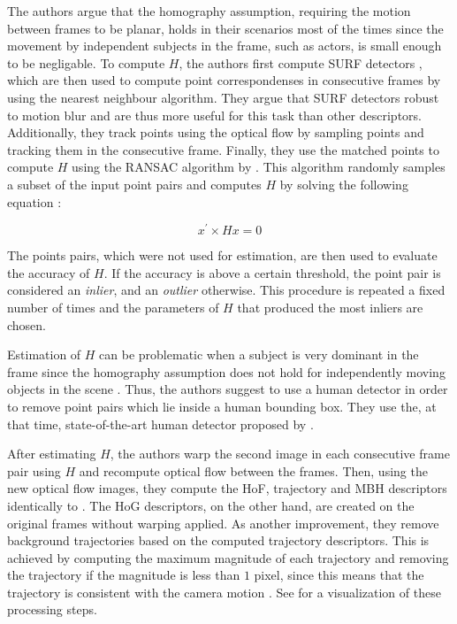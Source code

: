 The authors argue that the homography assumption, requiring the motion between frames to be planar, holds in their scenarios most of the times since the movement by independent subjects in the frame, such as actors, is small enough to be negligable.
To compute $H$, the authors first compute SURF detectors \cite{bay_surf:_2006}, which are then used to compute point correspondenses in consecutive frames by using the nearest neighbour algorithm.
They argue that SURF detectors robust to motion blur and are thus more useful for this task than other descriptors.
Additionally, they track points using the optical flow by sampling points and tracking them in the consecutive frame.
Finally, they use the matched points to compute $H$ using the RANSAC algorithm by \cite{fischler_random_1981}.
This algorithm randomly samples a subset of the input point pairs and computes $H$ by solving the following equation \cite{vincent_detecting_2001}:

\begin{equation}
    x^\prime \times Hx = 0 
\end{equation}

The points pairs, which were not used for estimation, are then used to evaluate the accuracy of $H$.
If the accuracy is above a certain threshold, the point pair is considered an \textit{inlier}, and an \textit{outlier} otherwise.
This procedure is repeated a fixed number of times and the parameters of $H$ that produced the most inliers are chosen. 

Estimation of $H$ can be problematic when a subject is very dominant in the frame since the homography assumption does not hold for independently moving objects in the scene \cite{wang_action_2013}.
Thus, the authors suggest to use a human detector in order to remove point pairs which lie inside a human bounding box.
They use the, at that time, state-of-the-art human detector proposed by \cite{prest_weakly_2012}.

After estimating $H$, the authors warp the second image in each consecutive frame pair using $H$ and recompute optical flow between the frames.
Then, using the new optical flow images, they compute the HoF, trajectory and MBH descriptors identically to \cite{wang_dense_2013}.
The HoG descriptors, on the other hand, are created on the original frames without warping applied.
As another improvement, they remove background trajectories based on the computed trajectory descriptors.
This is achieved by computing the maximum magnitude of each trajectory and removing the trajectory if the magnitude is less than $1$ pixel, since this means that the trajectory is consistent with the camera motion \cite{wang_action_2013}.
See  for a visualization of these processing steps.

